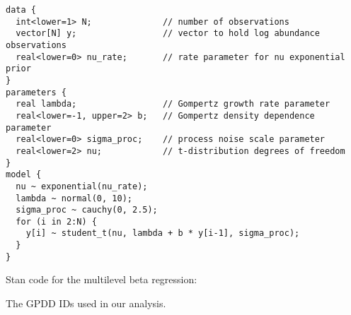 \documentclass[12pt]{article}
\begin{document}
\begin{footnotesize}
\begin{verbatim}
data {
  int<lower=1> N;              // number of observations
  vector[N] y;                 // vector to hold log abundance observations
  real<lower=0> nu_rate;       // rate parameter for nu exponential prior
}
parameters {
  real lambda;                 // Gompertz growth rate parameter
  real<lower=-1, upper=2> b;   // Gompertz density dependence parameter
  real<lower=0> sigma_proc;    // process noise scale parameter
  real<lower=2> nu;            // t-distribution degrees of freedom
}
model {
  nu ~ exponential(nu_rate);
  lambda ~ normal(0, 10);
  sigma_proc ~ cauchy(0, 2.5);
  for (i in 2:N) {
    y[i] ~ student_t(nu, lambda + b * y[i-1], sigma_proc);
  }
}
\end{verbatim}
\end{footnotesize}


\clearpage
\noindent
Stan code for the multilevel beta regression:
\begin{footnotesize}

\end{footnotesize}

\clearpage

\noindent
The GPDD IDs used in our analysis.

\begin{footnotesize}
\noindent
{\tt

}
\end{footnotesize}
\normalsize
\end{document}
